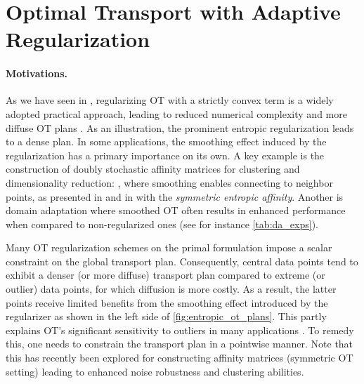 
\section{Optimal Transport with Adaptive Regularization}\label{sec:OTARI}


\paragraph{Motivations.}
As we have seen in , regularizing OT with a strictly convex term is a widely adopted practical approach, leading to reduced numerical complexity and more diffuse OT plans \citep{peyre2019computational}.
As an illustration, the prominent entropic regularization \citep{cuturi2013sinkhorn} leads to a dense plan.
In some applications, the smoothing effect induced by the regularization has a primary importance on its own. A key example is the construction of doubly stochastic affinity matrices for clustering and dimensionality reduction: \citep{landa2021doubly,Zass}, where smoothing enables connecting to neighbor points, as presented in  and in  with the \emph{symmetric entropic affinity}.
Another is domain adaptation \citep{courty2017joint} where smoothed OT often results in enhanced performance when compared to non-regularized ones (see for instance \cref{tab:da_exps}). 

Many OT regularization schemes on the primal formulation impose a scalar constraint on the global transport plan.
Consequently, central data points tend to exhibit a denser (or more diffuse) transport plan compared to extreme (or outlier) data points, for which diffusion is more costly. As a result, the latter points receive limited benefits from the smoothing effect introduced by the regularizer as shown in the left side of \cref{fig:entropic_ot_plans}. This partly explains OT's significant sensitivity to outliers in many applications \citep{mukherjee2021outlier, pmlr-v202-chuang23a}. 
To remedy this, one needs to constrain the transport plan in a pointwise manner.
Note that this has recently been explored for constructing affinity matrices \citep{van2023snekhorn} (\ie symmetric OT setting) leading to enhanced noise robustness and clustering abilities.

